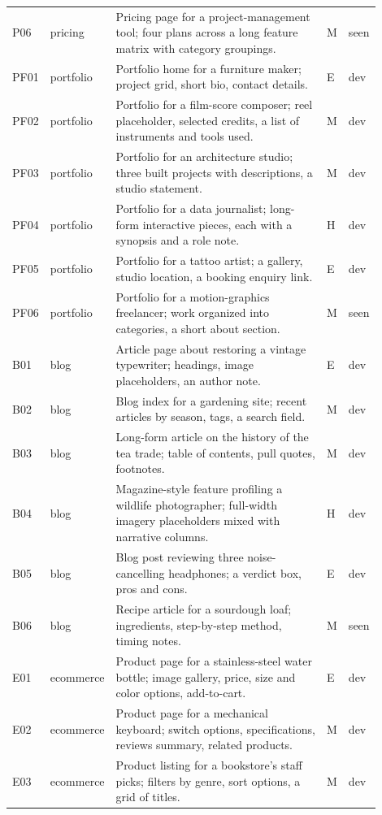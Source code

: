 \begin{small}
\begin{longtable}{@{}p{0.045\linewidth}p{0.075\linewidth}p{0.70\linewidth}p{0.02\linewidth}p{0.055\linewidth}@{}}
P06 & pricing & Pricing page for a project-management tool; four plans across a long feature matrix with category groupings. & M & seen \\
PF01 & portfolio & Portfolio home for a furniture maker; project grid, short bio, contact details. & E & dev \\
PF02 & portfolio & Portfolio for a film-score composer; reel placeholder, selected credits, a list of instruments and tools used. & M & dev \\
PF03 & portfolio & Portfolio for an architecture studio; three built projects with descriptions, a studio statement. & M & dev \\
PF04 & portfolio & Portfolio for a data journalist; long-form interactive pieces, each with a synopsis and a role note. & H & dev \\
PF05 & portfolio & Portfolio for a tattoo artist; a gallery, studio location, a booking enquiry link. & E & dev \\
PF06 & portfolio & Portfolio for a motion-graphics freelancer; work organized into categories, a short about section. & M & seen \\
B01 & blog & Article page about restoring a vintage typewriter; headings, image placeholders, an author note. & E & dev \\
B02 & blog & Blog index for a gardening site; recent articles by season, tags, a search field. & M & dev \\
B03 & blog & Long-form article on the history of the tea trade; table of contents, pull quotes, footnotes. & M & dev \\
B04 & blog & Magazine-style feature profiling a wildlife photographer; full-width imagery placeholders mixed with narrative columns. & H & dev \\
B05 & blog & Blog post reviewing three noise-cancelling headphones; a verdict box, pros and cons. & E & dev \\
B06 & blog & Recipe article for a sourdough loaf; ingredients, step-by-step method, timing notes. & M & seen \\
E01 & ecommerce & Product page for a stainless-steel water bottle; image gallery, price, size and color options, add-to-cart. & E & dev \\
E02 & ecommerce & Product page for a mechanical keyboard; switch options, specifications, reviews summary, related products. & M & dev \\
E03 & ecommerce & Product listing for a bookstore's staff picks; filters by genre, sort options, a grid of titles. & M & dev \\

\end{longtable}
\end{small}
